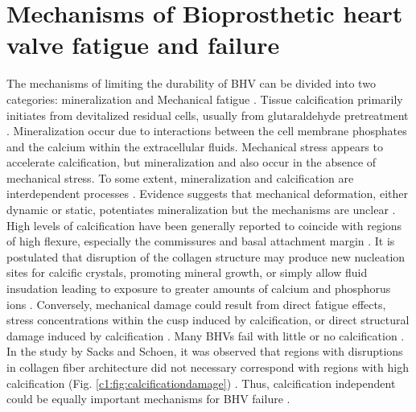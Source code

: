 \section{Mechanisms of Bioprosthetic heart valve fatigue and failure}

    The mechanisms of limiting the durability of BHV can be divided into two categories: mineralization and Mechanical fatigue \cite{schoen_tissue_1999,schoen_pathology_2001,schoen_calcification_2005}. Tissue calcification primarily initiates from devitalized residual cells, usually from glutaraldehyde pretreatment \cite{schoen_calcification_2005}. Mineralization occur due to interactions between the cell membrane phosphates and the calcium within the extracellular fluids. Mechanical stress appears to accelerate calcification, but mineralization and also occur in the absence of mechanical stress. 
    To some extent, mineralization and calcification are interdependent processes \cite{sacks_collagen_2002}. Evidence suggests that mechanical deformation, either dynamic or static, potentiates mineralization but the mechanisms are unclear \cite{schoen_tissue_1999}. High levels of calcification have been generally reported to coincide with regions of high flexure, especially the commissures and basal attachment margin \cite{thubrikar_aortic_1990,schoen_pathology_2001}. It is postulated that disruption of the collagen structure may produce new nucleation sites for calcific crystals, promoting mineral growth, or simply allow fluid insudation leading to exposure to greater amounts of calcium and phosphorus ions \cite{schoen_tissue_1999}. Conversely, mechanical damage could result from direct fatigue effects, stress concentrations within the cusp induced by calcification, or direct structural damage induced by calcification \cite{schoen_calcification_2005}. Many BHVs fail with little or no calcification \cite{schoen_tissue_1999,schoen_anatomic_1985,schoen_pathology_2001}. In the study by Sacks and Schoen, it was observed that regions with disruptions in collagen fiber architecture did not necessary correspond with regions with high calcification (Fig. \ref{c1:fig:calcificationdamage}) \cite{sacks_collagen_2002}. Thus, calcification independent could be equally important mechanisms for BHV failure .
    
